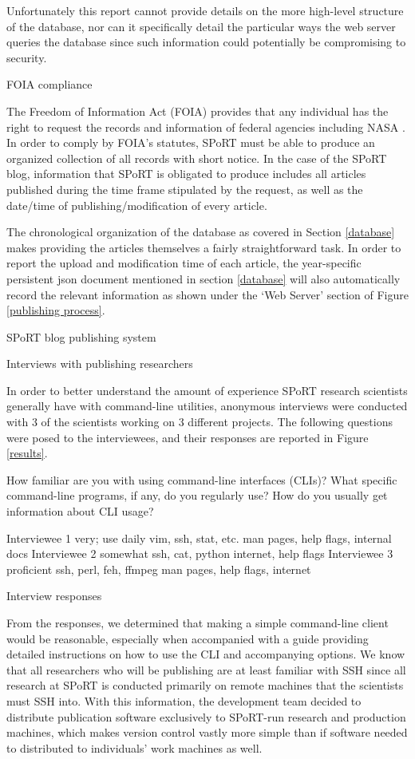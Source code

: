 Unfortunately this report cannot provide details on the more high-level structure of the database, nor can it specifically detail the particular ways the web server queries the database since such information could potentially be compromising to security.

FOIA compliance

The Freedom of Information Act (FOIA) provides that any individual has the right to request the records and information of federal agencies including NASA \cite{foia20}. In order to comply by FOIA's statutes, SPoRT must be able to produce an organized collection of all records with short notice. In the case of the SPoRT blog, information that SPoRT is obligated to produce includes all articles published during the time frame stipulated by the request, as well as the date/time of publishing/modification of every article.

The chronological organization of the database as covered in Section \ref{database} makes providing the articles themselves a fairly straightforward task. In order to report the upload and modification time of each article, the year-specific persistent json document mentioned in section \ref{database} will also automatically record the relevant information as shown under the `Web Server' section of Figure \ref{publishing process}.

SPoRT blog publishing system

Interviews with publishing researchers

In order to better understand the amount of experience SPoRT research scientists generally have with command-line utilities, anonymous interviews were conducted with 3 of the scientists working on 3 different projects. The following questions were posed to the interviewees, and their responses are reported  in Figure \ref{results}.

How familiar are you with using command-line interfaces (CLIs)?
What specific command-line programs, if any, do you regularly use?
How do you usually get information about CLI usage?

Interviewee 1 very; use daily vim, ssh, stat, etc.  man pages, help flags, internal docs
Interviewee 2 somewhat ssh, cat, python internet, help flags
Interviewee 3 proficient ssh, perl, feh, ffmpeg man pages, help flags, internet

Interview responses

From the responses, we determined that making a simple command-line client would be reasonable, especially when accompanied with a guide \cite{dodson20} providing detailed instructions on how to use the CLI and accompanying options. We know that all researchers who will be publishing are at least familiar with SSH since all research at SPoRT is conducted primarily on remote machines that the scientists must SSH into. With this information, the development team decided to distribute publication software exclusively to SPoRT-run research and production machines, which makes version control vastly more simple than if software needed to distributed to individuals' work machines as well.

